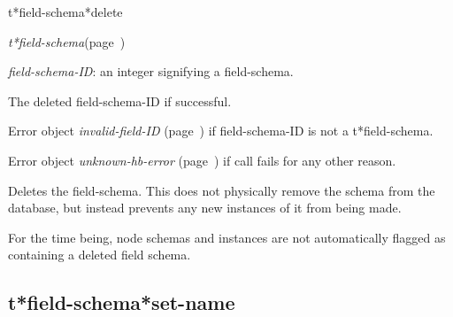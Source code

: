\begin{description}
\item [Name:]  t*field-schema*delete

\item [Class:] {\sl t*field-schema}\hfill(page~\pageref{t*field-schema})

\item [Parameters:]
\item {\sl field-schema-ID}:  an integer signifying a field-schema.


\item [Return-value:]
The deleted field-schema-ID if successful.

Error object {\sl invalid-field-ID} (page~\pageref{invalid-field-ID}) if field-schema-ID
is not a t*field-schema.

Error object {\sl unknown-hb-error} (page~\pageref{unknown-hb-error}) if call fails
for any other reason.

\item [Description:]

Deletes the field-schema.  This does not physically
remove the schema from the database, but instead
prevents any new instances of it from being made.

For the time being, node schemas and instances are
not automatically flagged as containing a deleted
field schema. 


\item [Public:]



\end{description}
\horizontalline

\subsection{t*field-schema*set-name}
\label{t*field-schema*set-name}

